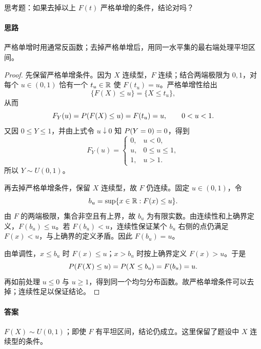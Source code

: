 思考题：如果去掉以上 $F(t)$ 严格单增的条件，结论对吗？
\paragraph{思路} 严格单增时用通常反函数；去掉严格单增后，用同一水平集的最右端处理平坦区间。
\begin{proof}
先保留严格单增条件。因为 $X$ 连续型，$F$ 连续；结合两端极限为 $0,1$，对每个 $u\in(0,1)$ 恰有一个 $t_u\in\R$ 使 $F(t_u)=u$。严格单增性给出
\[
\{F(X)\leq u\}=\{X\leq t_u\},
\]
从而
\[
F_Y(u)=\P(F(X)\leq u)=F(t_u)=u,\qquad0<u<1.
\]
又因 $0\leq Y\leq1$，并由上式令 $u\downarrow0$ 知 $\P(Y=0)=0$，得到
\[
F_Y(u)=\begin{cases}0,&u<0,\\u,&0\leq u\leq1,\\1,&u>1.\end{cases}
\]
所以 $Y\sim U(0,1)$。

再去掉严格单增条件，保留 $X$ 连续型，故 $F$ 仍连续。固定 $u\in(0,1)$，令
\[
b_u=\sup\{x\in\R:F(x)\leq u\}.
\]
由 $F$ 的两端极限，集合非空且有上界，故 $b_u$ 为有限实数。由连续性和上确界定义，$F(b_u)\leq u$。若 $F(b_u)<u$，连续性保证某个 $b_u$ 右侧的点仍满足 $F(x)<u$，与上确界的定义矛盾。因此 $F(b_u)=u$。

由单调性，$x\leq b_u$ 时 $F(x)\leq u$；$x>b_u$ 时按上确界定义 $F(x)>u$。于是
\[
\P(F(X)\leq u)=\P(X\leq b_u)=F(b_u)=u.
\]
再如前处理 $u\leq0$ 与 $u\geq1$，得到同一个均匀分布函数。故严格单增条件可以去掉；连续性足以保证结论。
\end{proof}
\paragraph{答案} $F(X)\sim U(0,1)$；即使 $F$ 有平坦区间，结论仍成立。这里保留了题设中 $X$ 连续型的条件。
